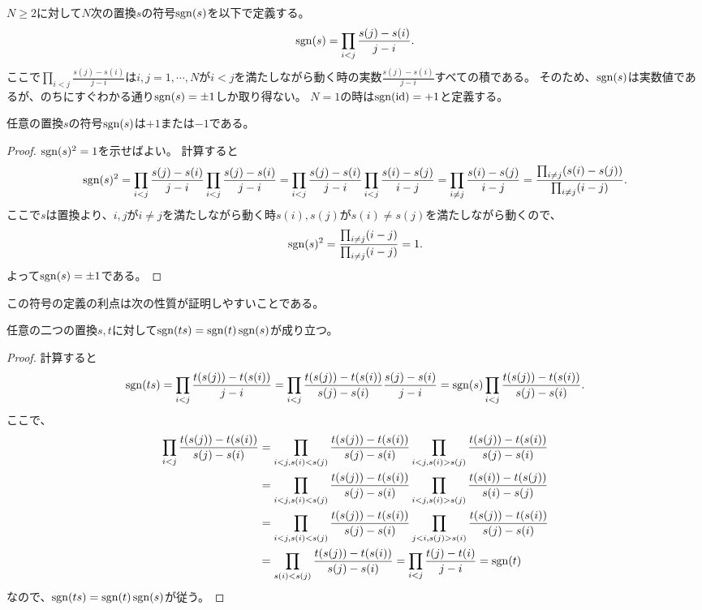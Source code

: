 \begin{definition}[置換の符号]
$N \ge 2$に対して$N$次の置換$s$の符号$\operatorname{sgn}(s)$を以下で定義する。
$$
\operatorname{sgn}(s) = \prod_{i < j}\frac{s(j)-s(i)}{j-i}.
$$
ここで$\prod_{i < j}\frac{s(j)-s(i)}{j-i}$は$i, j = 1, \cdots, N$が$i < j$を満たしながら動く時の実数$\frac{s(j)-s(i)}{j-i}$すべての積である。
そのため、$\operatorname{sgn}(s)$は実数値であるが、のちにすぐわかる通り$\operatorname{sgn}(s) = \pm 1$しか取り得ない。
$N = 1$の時は$\operatorname{sgn}(\mathrm{id}) = +1$と定義する。
\end{definition}

\begin{proposition}
任意の置換$s$の符号$\operatorname{sgn}(s)$は$+1$または$-1$である。
\end{proposition}

\begin{proof}
$\operatorname{sgn}(s)^2 = 1$を示せばよい。
計算すると
$$
\operatorname{sgn}(s)^2
= \prod_{i < j}\frac{s(j)-s(i)}{j-i}\prod_{i < j}\frac{s(j)-s(i)}{j-i}
= \prod_{i < j}\frac{s(j)-s(i)}{j-i}\prod_{i < j}\frac{s(i)-s(j)}{i-j}
= \prod_{i \ne j}\frac{s(i)-s(j)}{i-j}
= \frac{\prod_{i \ne j}(s(i)-s(j))}{\prod_{i \ne j}(i-j)}.
$$
ここで$s$は置換より、$i, j$が$i \ne j$を満たしながら動く時$s(i), s(j)$が$s(i) \ne s(j)$を満たしながら動くので、
$$
\operatorname{sgn}(s)^2
= \frac{\prod_{i \ne j}(i-j)}{\prod_{i \ne j}(i-j)}
= 1.
$$
よって$\operatorname{sgn}(s) = \pm 1$である。
\end{proof}

この符号の定義の利点は次の性質が証明しやすいことである。

\begin{proposition}
任意の二つの置換$s, t$に対して$\operatorname{sgn}(t s) = \operatorname{sgn}(t)\operatorname{sgn}(s)$が成り立つ。
\end{proposition}

\begin{proof}
計算すると
$$
\operatorname{sgn}(t s)
= \prod_{i < j}\frac{t(s(j))-t(s(i))}{j-i}
= \prod_{i < j}\frac{t(s(j))-t(s(i))}{s(j)-s(i)}\frac{s(j)-s(i)}{j-i}
= \operatorname{sgn}(s)\prod_{i < j}\frac{t(s(j))-t(s(i))}{s(j)-s(i)}.
$$
ここで、
$$
\begin{aligned}
\prod_{i < j}\frac{t(s(j))-t(s(i))}{s(j)-s(i)}
&= \prod_{i < j, s(i) < s(j)}\frac{t(s(j))-t(s(i))}{s(j)-s(i)}\prod_{i < j, s(i) > s(j)}\frac{t(s(j))-t(s(i))}{s(j)-s(i)} \\
&= \prod_{i < j, s(i) < s(j)}\frac{t(s(j))-t(s(i))}{s(j)-s(i)}\prod_{i < j, s(i) > s(j)}\frac{t(s(i))-t(s(j))}{s(i)-s(j)} \\
&= \prod_{i < j, s(i) < s(j)}\frac{t(s(j))-t(s(i))}{s(j)-s(i)}\prod_{j < i, s(j) > s(i)}\frac{t(s(j))-t(s(i))}{s(j)-s(i)} \\
&= \prod_{s(i) < s(j)}\frac{t(s(j))-t(s(i))}{s(j)-s(i)}
= \prod_{i < j}\frac{t(j)-t(i)}{j-i}
= \operatorname{sgn}(t)
\end{aligned}
$$
なので、$\operatorname{sgn}(t s) = \operatorname{sgn}(t)\operatorname{sgn}(s)$が従う。
\end{proof}

